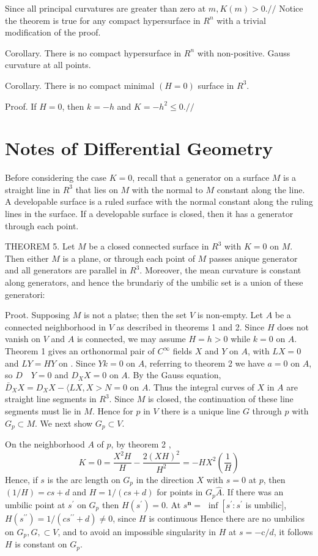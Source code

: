 \documentclass[10pt]{article}
\begin{document}
Since all principal curvatures are greater than zero at $m, K(m)>0 . / /$ Notice the theorem is true for any compact hypersurface in $R^{n}$ with a trivial modification of the proof.

Corollary. There is no compact hypersurface in $R^{n}$ with non-positive. Gauss curvature at all points.

Corollary. There is no compact minimal $(H=0)$ surface in $R^{3}$.

Proof. If $H=0$, then $k=-h$ and $K=-h^{2} \leq 0 . / /$

\section{Notes of Differential Geometry}
Before considering the case $K=0$, recall that a generator on a surface $M$ is a straight line in $R^{3}$ that lies on $M$ with the normal to $M$ constant along the line. A developable surface is a ruled surface with the normal constant along the ruling lines in the surface. If a developable surface is closed, then it has a generator through each point.

THEOREM 5. Let $M$ be a closed connected surface in $R^{3}$ with $K=0$ on $M$. Then either $M$ is a plane, or through each point of $M$ passes anique generator and all generators are parallel in $R^{3}$. Moreover, the mean curvature is constant along generators, and hence the brundariy of the umbilic set is a union of these generatori:

Proot. Supposing $M$ is not a platse; then the set $V$ is non-empty. Let $A$ be a connected neighborhood in $V$ as described in theorems 1 and 2. Since $H$ does not vanish on $V$ and $A$ is connected, we may assume $H=h>0$ while $k=0$ on $A$. Theorem 1 gives an orthonormal pair of $C^{\infty}$ fields $X$ and $Y$ on $A$, with $L X=0$ and $L Y=H Y$ on . Since $Y k=0$ on $A$, referring to theorem 2 we have $a=0$ on $A$, so $D \quad Y=0$ and $D_{X} X=0$ on $A .$ By the Gauss equation, $\bar{D}_{X} X=D_{X} X-\langle L X, X>N=0$ on $A$. Thus the integral curves of $X$ in $A$ are straight line segments in $R^{3}$. Since $M$ is closed, the continuation of these line segments must lie in $M$. Hence for $p$ in $V$ there is a unique line $G$ through $p$ with $G_{p} \subset M .$ We next show $G_{p} \subset V$.

On the neighborhood $A$ of $p$, by theorem 2 ,
$$
K=0=\frac{X^{2} H}{H}-\frac{2(X H)^{2}}{H^{2}}=-H X^{2}\left(\frac{1}{H}\right)
$$
Hence, if $s$ is the arc length on $G_{p}$ in the direction $X$ with $s=0$ at $p$, then $(1 / H)=c s+d$ and $H=1 /(c s+d)$ for points in $G_{p} \hat{A}$. If there was an umbilic point at $s^{\prime}$ on $G_{p}$ then $H\left(s^{\prime}\right)=0$. At $s^{\mathbf{n}}=$ $\inf \left[s^{\prime}: s^{\prime}\right.$ is umbilic], $H\left(s^{\prime \prime}\right)=1 /\left(c s^{\prime \prime}+d\right) \neq 0$, since $H$ is continuous Hence there are no umbilics on $G_{p}, G, \subset V$, and to avoid an impossible singularity in $H$ at $s=-\mathrm{c} / d$, it follows $H$ is constant on $G_{p}$.
\end{document}
